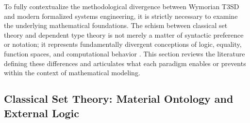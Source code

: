 \documentclass[11pt]{article}
\begin{document}
To fully contextualize the methodological divergence between Wymorian T3SD and modern formalized systems engineering, it is strictly necessary to examine the underlying mathematical foundations. The schism between classical set theory and dependent type theory is not merely a matter of syntactic preference or notation; it represents fundamentally divergent conceptions of logic, equality, function spaces, and computational behavior \parencite{Ref18, Ref23, Ref24, Ref25}. This section reviews the literature defining these differences and articulates what each paradigm enables or prevents within the context of mathematical modeling.

\subsection{Classical Set Theory: Material Ontology and External Logic}
\end{document}
